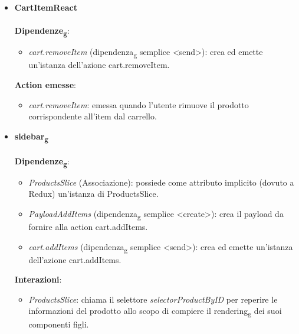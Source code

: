 \begin{itemize}
\begin{itemize}
	\end{itemize}
	\item \textbf{CartItemReact}
	\\\\
	\textbf{Dipendenze\textsubscript{g}}: 
	\begin{itemize}
		\item \textit{cart.removeItem} (dipendenza\textsubscript{g} semplice \textless send\textgreater): crea ed emette un'istanza dell'azione cart.removeItem.
	\end{itemize}
	\textbf{Action emesse}:
	\begin{itemize}
		\item \textit{cart.removeItem}: emessa quando l'utente rimuove il prodotto corrispondente all'item dal carrello.
	\end{itemize}
	\item \textbf{sidebar\textsubscript{g}}
	\\\\
	\textbf{Dipendenze\textsubscript{g}}:
	\begin{itemize}
		\item \textit{ProductsSlice} (Associazione): possiede come attributo implicito (dovuto a Redux) un'istanza di ProductsSlice.
		\item \textit{PayloadAddItems} (dipendenza\textsubscript{g} semplice \textless create\textgreater): crea il payload da fornire alla action cart.addItems.
		\item \textit{cart.addItems} (dipendenza\textsubscript{g} semplice \textless send\textgreater): crea ed emette un'istanza dell'azione cart.addItems.
		\end{itemize}
		\textbf{Interazioni}:
		\begin{itemize}
			\item \textit{ProductsSlice}: chiama il selettore \textit{selectorProductByID} per reperire le informazioni del prodotto 
			allo scopo di compiere il rendering\textsubscript{g} dei suoi componenti figli.
		\end{itemize}
\end{itemize}
